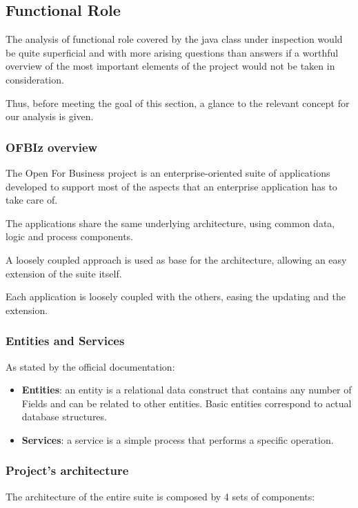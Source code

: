\subsection{Functional Role}

The analysis of functional role covered by the java class under inspection would be quite superficial and with more arising questions than answers if a worthful overview of the most important elements of the project would not be taken in consideration.

Thus, before meeting the goal of this section, a glance to the relevant concept for our analysis is given.

\subsubsection{OFBIz overview}
The Open For Business project is an enterprise-oriented suite of applications developed to support most of the aspects that an enterprise application has to take care of.

The applications share the same underlying architecture, using common data, logic and process components.

A loosely coupled approach is used as base for the architecture, allowing an easy extension of the suite itself.

Each application is loosely coupled with the others, easing the updating and the extension.

\subsubsection{Entities and Services}
As stated by the official documentation:

\begin{itemize}
	\item \textbf{Entities}: an entity is a relational data construct that contains any number of Fields and can be related to other entities. Basic entities correspond to actual database structures.
	\item \textbf{Services}: a service is a simple process that performs a specific operation.
\end{itemize}

\subsubsection{Project's architecture}

The architecture of the entire suite is composed by 4 sets of components:

